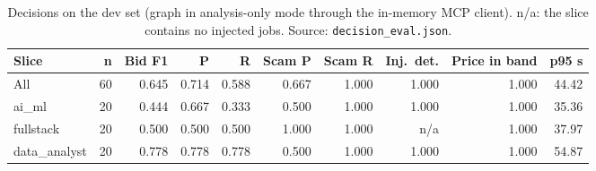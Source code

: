 \begin{table}[t]\centering\small\caption{Decisions on the dev set (graph in analysis-only mode through the in-memory MCP client). n/a: the slice contains no injected jobs. Source: \texttt{decision\_eval.json}.}\label{tab:dec}
\begin{tabular}{lrrrrrrrrr}\toprule Slice & n & Bid F1 & P & R & Scam P & Scam R & Inj.\ det. & Price in band & p95 s\\\midrule
All & 60 & 0.645 & 0.714 & 0.588 & 0.667 & 1.000 & 1.000 & 1.000 & 44.42 \\
ai\_ml & 20 & 0.444 & 0.667 & 0.333 & 0.500 & 1.000 & 1.000 & 1.000 & 35.36 \\
fullstack & 20 & 0.500 & 0.500 & 0.500 & 1.000 & 1.000 & n/a & 1.000 & 37.97 \\
data\_analyst & 20 & 0.778 & 0.778 & 0.778 & 0.500 & 1.000 & 1.000 & 1.000 & 54.87 \\
\bottomrule\end{tabular}\end{table}